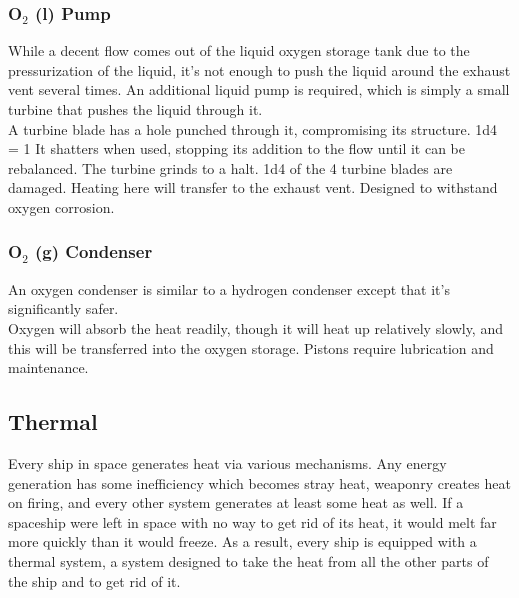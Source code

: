 \documentclass[a4paper]{article}
\begin{document}
\vspace{-0.5cm} \hspace{-18pt} \subsubsection{O$_2$ (l) Pump} \label{engine_o2_pump} \vspace{-0.2cm}
While a decent flow comes out of the liquid oxygen storage tank due to the pressurization of the liquid, it's not enough to push the liquid around the exhaust vent several times. An additional liquid pump is required, which is simply a small turbine that pushes the liquid through it.
\\ \pbhw
{A turbine blade has a hole punched through it, compromising its structure. \newline 1d4 = 1 It shatters when used, stopping its addition to the flow until it can be rebalanced.}
{The turbine grinds to a halt. 1d4 of the 4 turbine blades are damaged.}
{Heating here will transfer to the exhaust vent.}
{Designed to withstand oxygen corrosion.}


\vspace{-0.5cm} \hspace{-18pt} \subsubsection{O$_2$ (g) Condenser} \label{engine_o2_condenser} \vspace{-0.2cm}
An oxygen condenser is similar to a hydrogen condenser except that it's significantly safer.
\\ \pbhw
{}
{}
{Oxygen will absorb the heat readily, though it will heat up relatively slowly, and this will be transferred into the oxygen storage.}
{Pistons require lubrication and maintenance.}

\newpage
\subsection{Thermal} \label{thermal}

Every ship in space generates heat via various mechanisms. Any energy generation has some inefficiency which becomes stray heat, weaponry creates heat on firing, and every other system generates at least some heat as well. If a spaceship were left in space with no way to get rid of its heat, it would melt far more quickly than it would freeze. As a result, every ship is equipped with a thermal system, a system designed to take the heat from all the other parts of the ship and to get rid of it.
\end{document}
